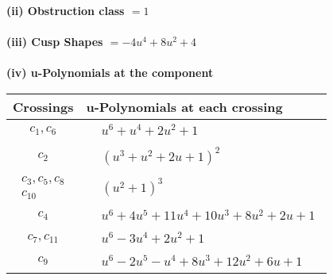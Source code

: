 \documentclass[1p]{elsarticle_modified}
\theoremstyle{definition}
\begin{document}
\flushleft \textbf{(ii) Obstruction class $= 1$}\\~\\
\flushleft \textbf{(iii) Cusp Shapes $= -4 u^4+8 u^2+4$}\\~\\
\newpage\renewcommand{\arraystretch}{1}
\flushleft \textbf{(iv) u-Polynomials at the component}\newline \\
\begin{tabular}{m{50pt}|m{274pt}}
Crossings & \hspace{64pt}u-Polynomials at each crossing \\
\hline $$\begin{aligned}c_{1},c_{6}\end{aligned}$$&$\begin{aligned}
&u^6+u^4+2 u^2+1
\end{aligned}$\\
\hline $$\begin{aligned}c_{2}\end{aligned}$$&$\begin{aligned}
&(u^3+u^2+2 u+1)^2
\end{aligned}$\\
\hline $$\begin{aligned}c_{3},c_{5},c_{8}\\c_{10}\end{aligned}$$&$\begin{aligned}
&(u^2+1)^3
\end{aligned}$\\
\hline $$\begin{aligned}c_{4}\end{aligned}$$&$\begin{aligned}
&u^6+4 u^5+11 u^4+10 u^3+8 u^2+2 u+1
\end{aligned}$\\
\hline $$\begin{aligned}c_{7},c_{11}\end{aligned}$$&$\begin{aligned}
&u^6-3 u^4+2 u^2+1
\end{aligned}$\\
\hline $$\begin{aligned}c_{9}\end{aligned}$$&$\begin{aligned}
&u^6-2 u^5- u^4+8 u^3+12 u^2+6 u+1
\end{aligned}$\\
\hline
\end{tabular}\\~\\
\end{document}
